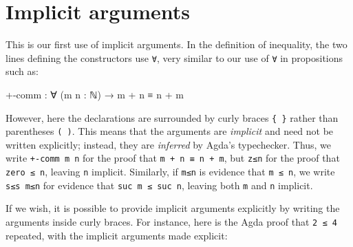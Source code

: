 \hypertarget{implicit-arguments}{%
\section{Implicit arguments}\label{implicit-arguments}}

This is our first use of implicit arguments. In the definition of
inequality, the two lines defining the constructors use \texttt{∀}, very
similar to our use of \texttt{∀} in propositions such as:

\begin{myDisplay}
+-comm : ∀ (m n : ℕ) → m + n ≡ n + m
\end{myDisplay}

However, here the declarations are surrounded by curly braces
\texttt{\{\ \}} rather than parentheses \texttt{(\ )}. This means that
the arguments are \emph{implicit} and need not be written explicitly;
instead, they are \emph{inferred} by Agda's typechecker. Thus, we write
\texttt{+-comm\ m\ n} for the proof that \texttt{m\ +\ n\ ≡\ n\ +\ m},
but \texttt{z≤n} for the proof that \texttt{zero\ ≤\ n}, leaving
\texttt{n} implicit. Similarly, if \texttt{m≤n} is evidence that
\texttt{m\ ≤\ n}, we write \texttt{s≤s\ m≤n} for evidence that
\texttt{suc\ m\ ≤\ suc\ n}, leaving both \texttt{m} and \texttt{n}
implicit.

If we wish, it is possible to provide implicit arguments explicitly by
writing the arguments inside curly braces. For instance, here is the
Agda proof that \texttt{2\ ≤\ 4} repeated, with the implicit arguments
made explicit:

\begin{fence}
\begin{code}%
\>[0]\AgdaFunction{\AgdaUnderscore{}}\AgdaSpace{}%
\AgdaSymbol{:}\AgdaSpace{}%
\AgdaSpace{}%
\AgdaSpace{}%
\<%
\\
\>[0]\AgdaSymbol{\AgdaUnderscore{}}\AgdaSpace{}%
\AgdaSymbol{=}\AgdaSpace{}%
\AgdaSpace{}%
\AgdaSymbol{\{}\AgdaSymbol{\}}\AgdaSpace{}%
\AgdaSymbol{\{}\AgdaSymbol{\}}\AgdaSpace{}%
\AgdaSymbol{(}\AgdaSpace{}%
\AgdaSymbol{\{}\AgdaSymbol{\}}\AgdaSpace{}%
\AgdaSymbol{\{}\AgdaSymbol{\}}\AgdaSpace{}%
\AgdaSymbol{(}\AgdaSpace{}%
\AgdaSymbol{\{}\AgdaSymbol{\}))}\<%
\end{code}
\end{fence}

